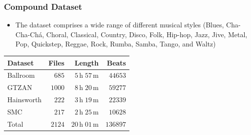 \documentclass{beamer}
\begin{document}
\begin{frame}
\frametitle{Compound Dataset}
\begin{itemize}
\item The dataset comprises a wide range of different musical styles
(Blues, Cha-Cha-Chá, Choral, Classical, Country, Disco, Folk, Hip-hop, Jazz, Jive, Metal, Pop, Quickstep, Reggae, Rock, Rumba, Samba, Tango, and Waltz)
\end{itemize}
\begin{table}[htbp]
\centering
\footnotesize
\begin{tabular}{lrrr}
\hline
\hline
\textbf{Dataset} & \textbf{Files} & \textbf{Length} & \textbf{Beats} \\
\hline
Ballroom \cite{Gouyon2006b, Krebs2013} & $685$ & $5\,\text{h} \;57\,\text{m}$ & $\num{44653}$\\
GTZAN \cite{Tzanetakis2002b, marchand2015swing} & $1000$ & $8\,\text{h}\;20\,\text{m}$ & $\num{59277}$\\
Hainsworth \cite{Hainsworth2004} & $222$ & $3\,\text{h}\;19\,\text{m}$ & $\num{22339}$\\
SMC \cite{Holzapfel2012} & $217$ & $2\,\text{h}\;25\,\text{m}$ & $\num{10628}$\\    
\hline
Total & $2124$ & $ 20\,\text{h}\; 01\,\text{m}$ & $\num{136897}$\\  
\hline
\hline
\end{tabular}
\end{table}  
\end{frame}
\end{document}
